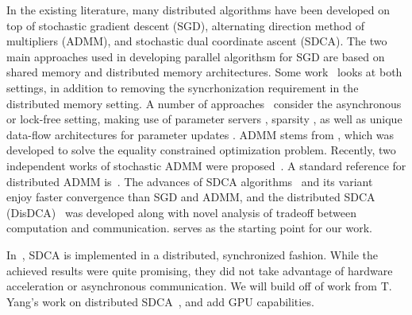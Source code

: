 \documentclass{article}
\begin{document}
In the existing literature, many distributed algorithms have been developed on
top of stochastic gradient descent (SGD), alternating direction method of
multipliers (ADMM), and stochastic dual coordinate ascent (SDCA). The two main
approaches used in developing parallel algorithsm for SGD are based on shared
memory and distributed memory architectures. Some
work~\cite{lian2015asynchronous} looks at both settings, in addition to
removing the syncrhonization requirement in the distributed memory setting.  A
number of
approaches~\cite{zinkevich2010parallelized,recht2011hogwild,agarwal2011distributed}
consider the asynchronous or lock-free setting, making use of parameter servers
\cite{li2014scaling}, sparsity \cite{recht2011hogwild}, as well as unique
data-flow architectures for parameter updates \cite{agarwal2011distributed}.
ADMM stems from \cite{gabay1976dual}, which was developed to solve the equality
constrained optimization problem. Recently, two independent works of stochastic
ADMM were proposed~\cite{ouyang2013stochastic,suzuki2013dual}. A standard
reference for distributed ADMM is~\cite{boyd2011distributed}. The advances of
SDCA algorithms~\cite{shalev2013stochastic} and its
variant~\cite{shalev2013accelerated,shalev2014accelerated,lin2014accelerated}
enjoy faster convergence than SGD and ADMM, and the distributed SDCA
(DisDCA)~\cite{yang2013trading,yang2013analysis} was developed along with novel
analysis of tradeoff between computation and communication.
\cite{yang2013trading} serves as the starting point for our work.

In~\cite{yang2013trading}, SDCA is implemented in a distributed, synchronized
fashion. While the achieved results were quite promising, they did not take
advantage of hardware acceleration or asynchronous communication.  We will
build off of work from T. Yang's work on distributed
SDCA~\cite{yang2013trading}, and add GPU capabilities. 
\end{document}
